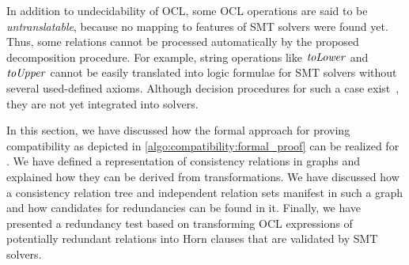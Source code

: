 In addition to undecidability of \gls{OCL}, some \gls{OCL} operations are said to be \emph{untranslatable}, because no mapping to features of \gls{SMT} solvers were found yet.
Thus, some \qvtr relations cannot be processed automatically by the proposed decomposition procedure.
For example, string operations like $\mathit{toLower}$ and $\mathit{toUpper}$ cannot be easily translated into logic formulae for \gls{SMT} solvers without several used-defined axioms.
Although decision procedures for such a case exist~\cite{veanes2012transducers}, they are not yet integrated into solvers.

In this section, we have discussed how the formal approach for proving compatibility as depicted in \autoref{algo:compatibility:formal_proof} can be realized for \qvtr.
We have defined a representation of consistency relations in graphs and explained how they can be derived from \qvtr transformations.
We have discussed how a consistency relation tree and independent relation sets manifest in such a graph and how candidates for redundancies can be found in it.
Finally, we have presented a redundancy test based on transforming \gls{OCL} expressions of potentially redundant relations into Horn clauses that are validated by \gls{SMT} solvers.

